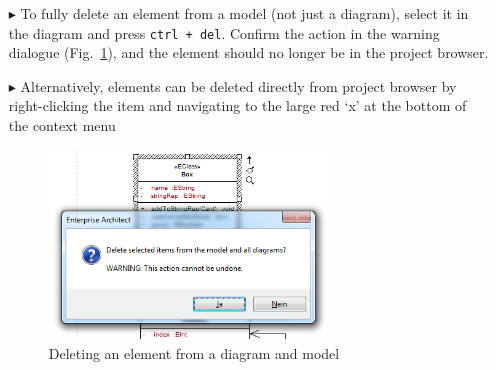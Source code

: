 \begin{itemize}
\item[$\blacktriangleright$] To fully delete an element from a model (not just a diagram), select it in the diagram and press \texttt{ctrl + del}. Confirm the
action in the warning dialogue (Fig.~\ref{ea:deleteWarning}), and the element should no longer be in the project browser.

\vspace{0.5cm}

\item[$\blacktriangleright$] Alternatively, elements can be deleted directly from project browser by right-clicking the item and navigating to the large
red `x' at the bottom of the context menu

\begin{figure}[htbp]
\begin{center}
  \includegraphics[width=0.7\textwidth]{ea_deleteWarning}
  \caption{Deleting an element from a diagram and model}  
  \label{ea:deleteWarning}
\end{center}
\end{figure}  

\end{itemize}
